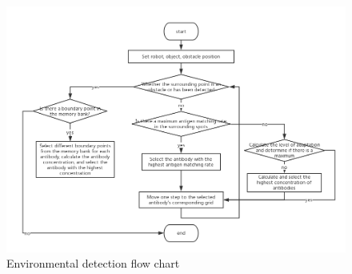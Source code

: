 \documentclass[Proceedings]{ascelike}
\begin{document}
\begin{figure}
\centering
     \includegraphics[scale=0.40] {img/immune_network_flowchat.png}
    \caption{Environmental detection flow chart}
\end{figure}
\end{document}
